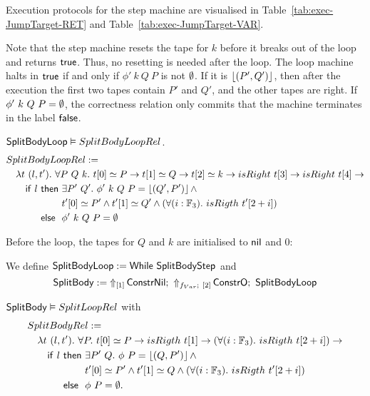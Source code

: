 Execution protocols for the step machine are visualised in Table~\ref{tab:exec-JumpTarget-RET} and Table~\ref{tab:exec-JumpTarget-VAR}.

Note that the step machine resets the tape for $k$ before it breaks out of the loop and returns $\true$.  Thus, no resetting is needed after the loop.
The loop machine halts in $\true$ if and only if $\phi'~k~Q~P$ is not $\None$.  If it is $\Some{(P',Q')}$, then after the execution the first two
tapes contain $P'$ and $Q'$, and the other tapes are right.  If $\phi'~k~Q~P = \None$, the correctness relation only commits that the machine
terminates in the label $\false$.
\begin{lemma}
  $\MS{SplitBodyLoop} \Realise SplitBodyLoopRel$.
  \begin{alignat*}{1}
    & SplitBodyLoopRel := \\
    &\quad \lambda t~(l, t').~\forall P~Q~k.~t[0] \simeq P \rightarrow t[1] \simeq Q \rightarrow t[2] \simeq k \rightarrow isRight~t[3] \rightarrow isRight~t[4] \rightarrow \\
    &\qquad \MS{if}~l~\pthen~\exists P'~Q'.~ \phi'~k~Q~P = \Some{(Q', P')} \land \\
    &\qquad \phantom{\MS{if}~l~\pthen}~t'[0] \simeq P' \land t'[1] \simeq Q' \land \left(\forall(i:\Fin_3).~isRigth~t'[2+i]\right) \\
    &\qquad \phantom{\MS{if}~l}~\pelse~\phi'~k~Q~P=\None
\end{alignat*}
\end{lemma}

Before the loop, the tapes for $Q$ and $k$ are initialised to $\nil$ and $0$:
\begin{definition}[$\MS{SplitBody}$][JumpTarget]
  We define $\MS{SplitBodyLoop} := \While~\MS{SplitBodyStep}$ and
  \[
    \MS{SplitBody} := \LiftTapes{\MS{ConstrNil}}{\Vector{1}} \Seq \LiftBoth{\MS{ConstrO}}{f_{Var}}{\Vector{2}} \Seq \MS{SplitBodyLoop}
  \]
\end{definition}
\begin{lemma}
  $\MS{SplitBody} \Realise SplitLoopRel$ with
  \begin{alignat*}{1}
    & SplitBodyRel := \\
    &\quad \lambda t~(l, t').~\forall P.~t[0] \simeq P \rightarrow isRigth~t[1] \rightarrow (\forall(i:\Fin_3).~isRigth~t[2+i]) \rightarrow \\
    &\qquad \MS{if}~l~\pthen~\exists P'~Q.~ \phi~P = \Some{(Q, P')} \land \\
    &\qquad \phantom{\MS{if}~l~\pthen}~t'[0] \simeq P' \land t'[1] \simeq Q \land \left(\forall(i:\Fin_3).~isRigth~t'[2+i]\right) \\
    &\qquad \phantom{\MS{if}~l}~\pelse~\phi~P=\None.
\end{alignat*}
\end{lemma}


